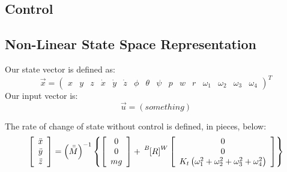 \documentclass{article}
\numberwithin{equation}{section}
\newcommand{\BtoW}{
\tensor[^B]{\left[R\right]}{^W}
}
\begin{document}
  \subsection{Control}
  
  \subsection{Non-Linear State Space Representation}
    Our state vector is defined as:
    \begin{equation}
      \label{stateVecEqn}
      \vec{x} = \left( \begin{array}{cccccccccccccccc}x&y&z& \dot{x}& \dot{y}& \dot{z}& \phi& \theta&
       \psi& p &w &r&\omega_1&\omega_2&\omega_3&\omega_4\end{array} \right)^T
    \end{equation}
    Our input vector is:
    \begin{equation}
      \label{inputVecEqn}
      \vec{u} = \left(something\right)
    \end{equation}
    
    The rate of change of state without control is defined, in pieces, below:
    \begin{equation}
    \label{linAccelStateStep}
    \left[\begin{array}{c} \ddot{x} \\
    				   \ddot{y} \\
				   \ddot{z} \end{array} \right]
				   =
				   \left(\bar{\bar{M}}\right)^{-1}\left\{\left[ \begin{array}{ccc}
          0 \\
          0 \\
          mg \end{array} \right]
          +
    \BtoW \left[\begin{array}{ccc}
         0 \\
         0 \\
         K_t\left(\omega_1^2 + \omega_2^2 + \omega_3^2 + \omega_4^2\right)
         \end{array}\right]
\right\}
\end{equation}
\end{document}
